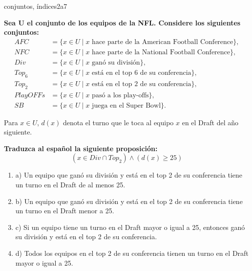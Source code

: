 \documentclass{article}
\begin{document}
\begin{question}{23}{conjuntos, índices}{2}{a}{7}{
\textbf{Sea U el conjunto de los equipos de la NFL. Considere los siguientes conjuntos:}
\[
\begin{aligned}
AFC &= \{ x \in U \mid x \text{ hace parte de la American Football Conference}\},\\
NFC &= \{ x \in U \mid x \text{ hace parte de la National Football Conference}\},\\
Div &= \{ x \in U \mid x \text{ ganó su división}\},\\
Top_6 &= \{ x \in U \mid x \text{ está en el top 6 de su conferencia}\},\\
Top_2 &= \{ x \in U \mid x \text{ está en el top 2 de su conferencia}\},\\
PlayOFFs &= \{ x \in U \mid x \text{ pasó a los play-offs}\},\\
SB &= \{ x \in U \mid x \text{ juega en el Super Bowl}\}.
\end{aligned}
\]

Para $x \in U$, $d(x)$ denota el turno que le toca al equipo $x$ en el Draft del año siguiente. \smallskip

\textbf{Traduzca al español la siguiente proposición:}
\[
(x \in Div \cap Top_2)\land(d(x) \geq 25)
\]

\begin{enumerate}
    \item a) Un equipo que ganó su división y está en el top 2 de su conferencia tiene un turno en el Draft de al menos 25.  
    \item b) Un equipo que ganó su división y está en el top 2 de su conferencia tiene un turno en el Draft menor a 25.  
    \item c) Si un equipo tiene un turno en el Draft mayor o igual a 25, entonces ganó su división y está en el top 2 de su conferencia.  
    \item d) Todos los equipos en el top 2 de su conferencia tienen un turno en el Draft mayor o igual a 25.  
\end{enumerate}
}
\end{question}
\end{document}
